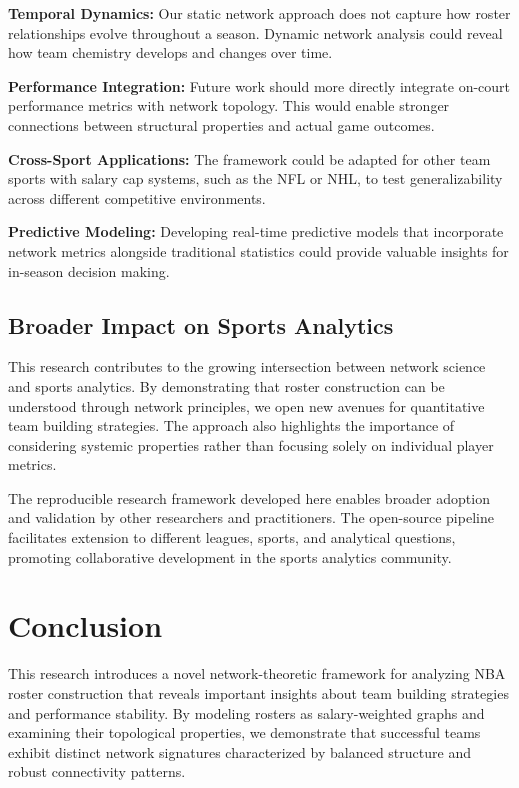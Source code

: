 \documentclass[11pt]{article}
\begin{document}
\textbf{Temporal Dynamics:} Our static network approach does not capture how roster relationships evolve throughout a season. Dynamic network analysis could reveal how team chemistry develops and changes over time.

\textbf{Performance Integration:} Future work should more directly integrate on-court performance metrics with network topology. This would enable stronger connections between structural properties and actual game outcomes.

\textbf{Cross-Sport Applications:} The framework could be adapted for other team sports with salary cap systems, such as the NFL or NHL, to test generalizability across different competitive environments.

\textbf{Predictive Modeling:} Developing real-time predictive models that incorporate network metrics alongside traditional statistics could provide valuable insights for in-season decision making.

\subsection{Broader Impact on Sports Analytics}

This research contributes to the growing intersection between network science and sports analytics. By demonstrating that roster construction can be understood through network principles, we open new avenues for quantitative team building strategies. The approach also highlights the importance of considering systemic properties rather than focusing solely on individual player metrics.

The reproducible research framework developed here enables broader adoption and validation by other researchers and practitioners. The open-source pipeline facilitates extension to different leagues, sports, and analytical questions, promoting collaborative development in the sports analytics community.

\section{Conclusion}

This research introduces a novel network-theoretic framework for analyzing NBA roster construction that reveals important insights about team building strategies and performance stability. By modeling rosters as salary-weighted graphs and examining their topological properties, we demonstrate that successful teams exhibit distinct network signatures characterized by balanced structure and robust connectivity patterns.
\end{document}
